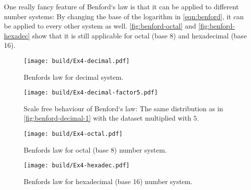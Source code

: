 One really fancy feature of Benford`s law is that it can be applied to different number systems: By changing the base of
the logarithm in \autoref{eqn:benford}, it can be applied to every other system as well. \autoref{fig:benford-octal} and
\autoref{fig:benford-hexadec} show that it is still applicable for octal (base 8) and hexadecimal (base 16).
\begin{figure}
  \centering
  \texttt{[image: build/Ex4-decimal.pdf]}
  \caption{Benfords law for decimal system.}
  \label{fig:benford-decimal-1}
\end{figure}
\begin{figure}
  \centering
  \texttt{[image: build/Ex4-decimal-factor5.pdf]}
  \caption{Scale free behaviour of Benford`s law: The same distribution as in \autoref{fig:benford-decimal-1} with the
  dataset multiplied with $5$.}
  \label{fig:benford-decimal-5}
\end{figure}
\begin{figure}
  \centering
  \texttt{[image: build/Ex4-octal.pdf]}
  \caption{Benfords law for octal (base 8) number system.}
  \label{fig:benford-octal}
\end{figure}
\begin{figure}
  \centering
  \texttt{[image: build/Ex4-hexadec.pdf]}
  \caption{Benfords law for hexadecimal (base 16) number system.}
  \label{fig:benford-hexadec}
\end{figure}



